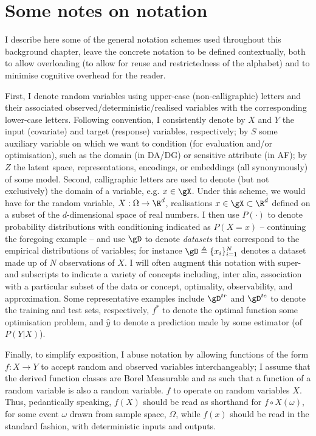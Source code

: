 \section{Some notes on notation}\label{sec:notation}
I describe here some of the general notation schemes used throughout this background chapter,
leave the concrete notation to be defined contextually, both to allow overloading (to allow for
reuse and restrictedness of the alphabet) and to minimise cognitive overhead for the reader.

%
First, I denote random variables using upper-case (non-calligraphic) letters and their associated
observed/deterministic/realised variables with the corresponding lower-case letters.
%
Following convention, I consistently denote by \(X\) and \(Y\) the input (covariate) and target
(response) variables, respectively; by \(S\) some auxiliary variable on which we want to condition
(for evaluation and/or optimisation), such as the domain (in \ac{DA}/\ac{DG}) or sensitive
attribute (in \ac{AF}); by \(Z\) the latent space, representations, encodings, or embeddings (all
synonymously) of some model.
%
Second, calligraphic letters are used to denote (but not exclusively) the domain of a variable,
e.g. \(x \in \gX \).
%
Under this scheme, we would have for the random variable, \(X: \Omega \to \R^d \), realisations \(x
\in \gX \subset \R^d \) defined on a subset of the \(d\)-dimensional space of real numbers.
%
I then use \(P(\cdot)\) to denote probability distributions with conditioning indicated as
\(P(X=x)\) -- continuing the foregoing example -- and use \(\gD\) to denote \emph{datasets} that
correspond to the empirical distributions of variables; for instance \(\gD \triangleq
\{x_i\}_{i=1}^N \) denotes a dataset made up of \(N\) observations of \(X\).
%
I will often augment this notation with super- and subscripts to indicate a variety of concepts
including, inter alia, association with a particular subset of the data or concept, optimality,
observability, and approximation.
%
Some representative examples include \(\gD^{tr}\) and \(\gD^{te}\) to denote the training and test
sets, respectively, \(f^\ast\) to denote the optimal function \wrt{} some optimisation problem, and
\(\hat{y}\) to denote a prediction made by some estimator (of \(P(Y|X)\)).
%

%
Finally, to simplify exposition, I abuse notation by allowing functions of the form \(f: X \to Y
\) to accept random and observed variables interchangeably; I assume that the derived function
classes are Borel Measurable and as such that a function of a random variable is also a random
variable. \(f\) to operate on random variables \(X\).
Thus, pedantically speaking, \( f(X) \) should be read as shorthand for \( f \circ X(\omega) \),
for some event \( \omega \) drawn from sample space, \( \Omega \), while \( f(x) \) should be read
in the standard fashion, with deterministic inputs and outputs.
